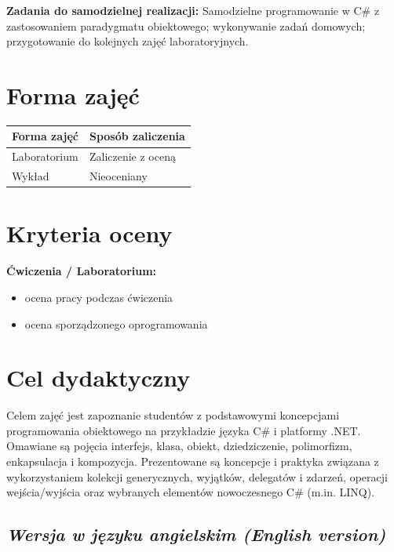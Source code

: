 \documentclass[12pt, a4paper]{article}
\newcommand{\thdrule}{\noalign{\global\setlength{\extrarowheight}{0pt}}}
\newcommand{\thdend}{\noalign{\global\setlength{\extrarowheight}{3pt}}}
\begin{document}
\vspace{4pt}
\noindent\textbf{Zadania do samodzielnej realizacji:} Samodzielne programowanie w C\# z zastosowaniem paradygmatu obiektowego; wykonywanie zadań domowych; przygotowanie do kolejnych zajęć laboratoryjnych.

\section{Forma zajęć}

\begin{center}
{\scriptsize
\begin{tabular}{m{5cm}m{8cm}}
\thdrule\toprule
\rowcolor{pjatkRed} {\color{white}\textbf{Forma zajęć}} & {\color{white}\textbf{Sposób zaliczenia}} \\
\midrule\thdend
  \rowcolor{tableRowLight} Laboratorium & Zaliczenie z oceną \\
  \rowcolor{tableRowAlt} Wykład & Nieoceniany \\
\bottomrule
\end{tabular}}
\end{center}

\section{Kryteria oceny}

\textbf{Ćwiczenia / Laboratorium:}
\begin{itemize}
  \item ocena pracy podczas ćwiczenia
  \item ocena sporządzonego oprogramowania
\end{itemize}


\section{Cel dydaktyczny}

Celem zajęć jest zapoznanie studentów z podstawowymi koncepcjami programowania obiektowego na przykładzie języka C\# i platformy .NET. Omawiane są pojęcia interfejs, klasa, obiekt, dziedziczenie, polimorfizm, enkapsulacja i kompozycja. Prezentowane są koncepcje i praktyka związana z wykorzystaniem kolekcji generycznych, wyjątków, delegatów i zdarzeń, operacji wejścia/wyjścia oraz wybranych elementów nowoczesnego C\# (m.in. LINQ).

\subsection*{\textit{Wersja w języku angielskim (English version)}}
\end{document}
